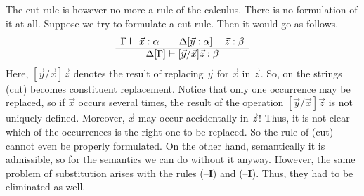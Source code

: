 The cut rule is however no more a rule of the calculus. There
is no formulation of it at all. Suppose we try to formulate a 
cut rule. Then it would go as follows.
\begin{equation}
\begin{array}{c}
                \Gamma \boldsymbol{\vdash} \vec{x} : \alpha \qquad
        \Delta[\vec{y} : \alpha] \boldsymbol{\vdash} \vec{z} : \beta
                        \\\hline
                    \Delta[\Gamma]  \boldsymbol{\vdash} [\vec{y}/\vec{x}]
            \vec{z} : \beta
                \end{array}
\end{equation}
Here, $[\vec{y}/\vec{x}]\vec{z}$ denotes the result of replacing
$\vec{y}$ for $\vec{x}$ in $\vec{z}$. So, on the strings (cut) 
becomes constituent replacement. Notice that only one occurrence 
may be replaced, so if $\vec{x}$ occurs several times, the result 
of the operation $[\vec{y}/\vec{x}]\vec{z}$ is not uniquely defined. 
Moreover, $\vec{x}$ may occur accidentally in $\vec{z}$! Thus, it 
is not clear which of the occurrences is the right one to be replaced. 
So the rule of (cut) cannot even be properly formulated. On 
the other hand, semantically it is admissible, so for the semantics 
we can do without it anyway. However, the same problem of 
substitution arises with the rules ({\mtt{\tf}}--\textbf{I}) and 
({\mtt{\tb}}--\textbf{I}). Thus, they had to be eliminated as 
well.

